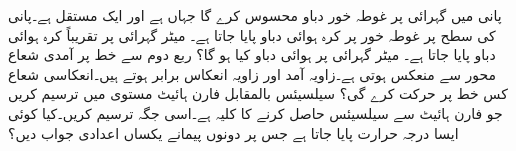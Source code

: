 \quad 
پانی میں  گہرائی پر غوطہ خور  دباو محسوس کرے گا جہاں  ہے  اور  ایک  مستقل ہے۔پانی کی سطح پر  غوطہ خور پر    کرہ ہوائی دباو پایا جاتا ہے۔  میٹر گہرائی پر تقریباً   کرہ ہوائی دباو پایا جاتا ہے۔ میٹر گہرائی پر  ہوائی دباو کیا ہو گا؟
\quad
ربع دوم سے خط  پر آمدی شعاع محور  سے منعکس ہوتی ہے۔زاویہ آمد اور زاویہ انعکاس برابر ہوتے ہیں۔انعکاسی شعاع کس خط پر حرکت کرے گی؟
\quad 
سیلسیئس بالمقابل فارن ہائیٹ مستوی  میں  ترسیم کریں جو فارن ہائیٹ سے سیلسیئس حاصل کرنے کا کلیہ ہے۔اسی جگہ  ترسیم کریں۔کیا کوئی ایسا  درجہ حرارت پایا جاتا ہے جس پر دونوں پیمانے یکساں اعدادی جواب دیں؟

\\


